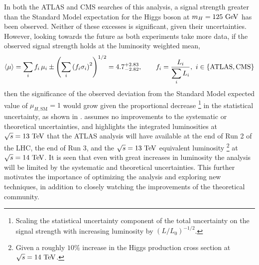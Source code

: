 In both the ATLAS and CMS searches of this analysis, a signal strength greater than the Standard Model expectation for the Higgs boson at $m_{H} = 125~\mathrm{GeV}$ has been observed.
Neither of these excesses is significant, given their uncertainties.
However, looking towards the future as both experiments take more data, if the observed signal strength holds at the luminosity weighted mean,
\[
 \braket{\mu} = \sum_{i} f_{i}\,\mu_{i} \pm \left(\sum_{i} \left(f_{i}\sigma_{i}\right)^{2}\right)^{1/2} = 4.7_{-2.82}^{+2.83}, \qquad f_{i} = \frac{L_{i}}{\displaystyle\sum_{i}L_{i}},~i \in \left\{\textrm{ATLAS}, \textrm{CMS}\right\}
\]
then the significance of the observed deviation from the Standard Model expected value of $\mu_{H, \textrm{SM}}=1$ would grow given the proportional decrease%
\footnote{Scaling the statistical uncertainty component of the total uncertainty on the signal strength with increasing luminosity by $\left(L/L_{0}\right)^{-1/2}$.}
in the statistical uncertainty, as shown in .
 assumes no improvements to the systematic or theoretical uncertainties, and highlights the integrated luminosities at $\sqrt{s}=13~\mathrm{TeV}$ that the ATLAS analysis will have available at the end of Run 2 of the LHC, the end of Run 3, and the $\sqrt{s}=13~\mathrm{TeV}$ equivalent luminosity%
\footnote{Given a roughly $10\%$ increase in the Higgs production cross section at $\sqrt{s}=14~\mathrm{TeV}$.}
at $\sqrt{s}=14~\mathrm{TeV}$.
It is seen that even with great increases in luminosity the analysis will be limited by the systematic and theoretical uncertainties.
This further motivates the importance of optimizing the analysis and exploring new techniques, in addition to closely watching the improvements of the theoretical community.


